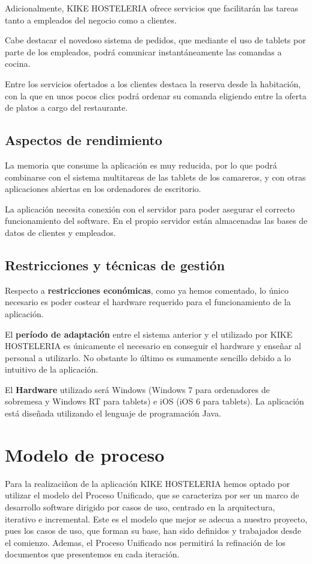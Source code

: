 \documentclass[spanish,a4paper,12pt]{report}	%
\begin{document}
Adicionalmente, KIKE HOSTELERIA ofrece servicios que facilitarán las tareas tanto a empleados del negocio como a clientes. 

Cabe destacar el novedoso sistema de pedidos, que mediante el uso de tablets por parte de los empleados, podrá comunicar instantáneamente las comandas a cocina. 

Entre los servicios ofertados a los clientes destaca la reserva desde la habitación, con la que en unos pocos clics podrá ordenar su comanda eligiendo entre la oferta de platos a cargo del restaurante.



		\subsection{Aspectos de rendimiento}  La memoria que consume la aplicación es muy reducida, por lo que podrá combinarse con el sistema multitareas de las tablets de los camareros, y con otras aplicaciones abiertas en los ordenadores de escritorio.

La aplicación necesita conexión con el servidor para poder asegurar el correcto funcionamiento del software. En el propio servidor están almacenadas las bases de datos de clientes y empleados.


		\subsection{Restricciones y técnicas de gestión}
Respecto a \textbf{restricciones económicas}, como ya hemos comentado, lo único necesario es poder costear el hardware requerido para el funcionamiento de la aplicación.

El \textbf{período de adaptación} entre el sistema anterior y el utilizado por KIKE HOSTELERIA es únicamente el necesario en conseguir el hardware y enseñar al personal a utilizarlo. No obstante lo último es sumamente sencillo debido a lo intuitivo de la aplicación.

El \textbf{Hardware} utilizado será Windows (Windows 7 para ordenadores de sobremesa y Windows RT para tablets) e iOS (iOS 6 para tablets). La aplicación está diseñada utilizando el lenguaje de programación Java.

	\section{Modelo de proceso} Para la realizaciñon de la aplicación KIKE HOSTELERIA hemos optado por utilizar el modelo del Proceso Unificado, que se caracteriza por ser un marco de desarrollo software dirigido por casos de uso, centrado en la arquitectura, iterativo e incremental. Este es el modelo que mejor se adecua a nuestro proyecto, pues los casos de uso, que forman su base, han sido definidos y trabajados desde el comienzo. Ademas, el Proceso Unificado nos permitirá la refinación de los documentos que presentemos en cada iteración.
\end{document}
